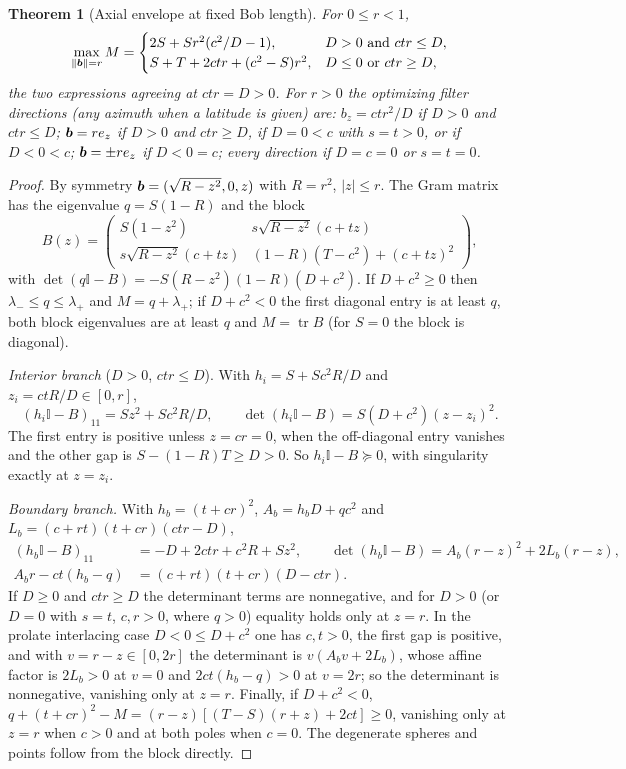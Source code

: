 \documentclass[11pt]{article}
\newtheorem{theorem}{Theorem}[section]
\theoremstyle{remark}\newtheorem{remark}[theorem]{Remark}
\DeclareMathOperator{\tr}{tr}\DeclareMathOperator{\diag}{diag}
\newcommand{\id}{\mathbb I}\newcommand{\ket}[1]{|#1\rangle}
\newcommand{\norm}[1]{\left\lVert#1\right\rVert}
\begin{document}
\begin{theorem}[Axial envelope at fixed Bob length]\label{thm:axial}
For $0\le r<1$,
\begin{equation}\label{eq:axial-envelope}
 \max_{\norm{\bv}=r}M=
 \begin{cases}
 2S+Sr^2(c^2/D-1),& D>0\ \text{and}\ ctr\le D,\\
 S+T+2ctr+(c^2-S)r^2,& D\le0\ \text{or}\ ctr\ge D,
 \end{cases}
\end{equation}
the two expressions agreeing at $ctr=D>0$. For $r>0$ the optimizing filter
directions (any azimuth when a latitude is given) are: $b_z=ctr^2/D$ if $D>0$
and $ctr\le D$; $\bm b=re_z$ if $D>0$ and $ctr\ge D$, if $D=0<c$ with $s=t>0$, or
if $D<0<c$; $\bm b=\pm re_z$ if $D<0=c$; every direction if $D=c=0$ or $s=t=0$.
\end{theorem}
\begin{proof}
By symmetry $\bm b=(\sqrt{R-z^2},0,z)$ with $R=r^2$, $|z|\le r$. The Gram matrix
has the eigenvalue $q=S(1-R)$ and the block
\[
 B(z)=\begin{pmatrix}
 S(1-z^2)&s\sqrt{R-z^2}(c+tz)\\
 s\sqrt{R-z^2}(c+tz)&(1-R)(T-c^2)+(c+tz)^2
 \end{pmatrix},
\]
with $\det(q\id-B)=-S(R-z^2)(1-R)(D+c^2)$. If $D+c^2\ge0$ then
$\lambda_-\le q\le\lambda_+$ and $M=q+\lambda_+$; if $D+c^2<0$ the first
diagonal entry is at least $q$, both block eigenvalues are at least $q$ and
$M=\tr B$ (for $S=0$ the block is diagonal).

\emph{Interior branch} ($D>0$, $ctr\le D$). With $h_i=S+Sc^2R/D$ and
$z_i=ctR/D\in[0,r]$,
\[
 (h_i\id-B)_{11}=Sz^2+Sc^2R/D,\qquad\det(h_i\id-B)=S(D+c^2)(z-z_i)^2.
\]
The first entry is positive unless $z=cr=0$, when the off-diagonal entry
vanishes and the other gap is $S-(1-R)T\ge D>0$. So $h_i\id-B\succeq0$, with
singularity exactly at $z=z_i$.

\emph{Boundary branch.} With $h_b=(t+cr)^2$, $A_b=h_bD+qc^2$ and
$L_b=(c+rt)(t+cr)(ctr-D)$,
\begin{align*}
 (h_b\id-B)_{11}&=-D+2ctr+c^2R+Sz^2,\qquad
 \det(h_b\id-B)=A_b(r-z)^2+2L_b(r-z),\\
 A_br-ct(h_b-q)&=(c+rt)(t+cr)(D-ctr).
\end{align*}
If $D\ge0$ and $ctr\ge D$ the determinant terms are nonnegative, and for
$D>0$ (or $D=0$ with $s=t$, $c,r>0$, where $q>0$) equality holds only at $z=r$.
In the prolate interlacing case $D<0\le D+c^2$ one has $c,t>0$, the first gap
is positive, and with $v=r-z\in[0,2r]$ the determinant is $v(A_bv+2L_b)$,
whose affine factor is $2L_b>0$ at $v=0$ and $2ct(h_b-q)>0$ at $v=2r$; so the
determinant is nonnegative, vanishing only at $z=r$. Finally, if $D+c^2<0$,
$q+(t+cr)^2-M=(r-z)[(T-S)(r+z)+2ct]\ge0$, vanishing only at $z=r$ when $c>0$
and at both poles when $c=0$. The degenerate spheres and points follow from
the block directly.
\end{proof}
\end{document}
